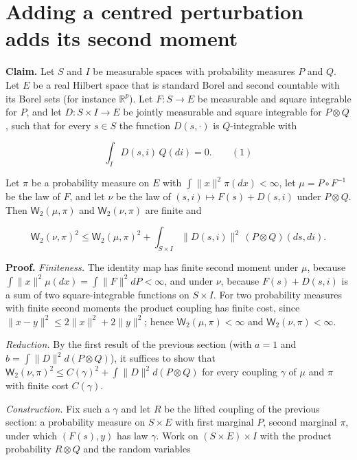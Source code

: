 \documentclass[11pt,a4paper]{article}
\begin{document}
\section{\texorpdfstring{Adding a centred perturbation adds its second moment}{Adding a centred perturbation adds its second moment}}


\textbf{Claim.} Let \(S\) and \(I\) be measurable spaces with probability measures \(P\) and \(Q\). Let \(E\) be a real Hilbert space that is standard Borel and second countable with its Borel sets (for instance \(\mathbb R^p\)). Let \(F:S\to E\) be measurable and square integrable for \(P\), and let \(D:S\times I\to E\) be jointly measurable and square integrable for \(P\otimes Q\), such that for every \(s\in S\) the function \(D(s,\cdot)\) is \(Q\)-integrable with


\[\int_ID(s,i)\,Q(di)=0.\qquad(1)\]


Let \(\pi\) be a probability measure on \(E\) with \(\int\|x\|^2\pi(dx)<\infty\), let \(\mu=P\circ F^{-1}\) be the law of \(F\), and let \(\nu\) be the law of \((s,i)\mapsto F(s)+D(s,i)\) under \(P\otimes Q\). Then \(\mathsf W_2(\mu,\pi)\) and \(\mathsf W_2(\nu,\pi)\) are finite and


\[\mathsf W_2(\nu,\pi)^2\le\mathsf W_2(\mu,\pi)^2+\int_{S\times I}\|D(s,i)\|^2\,(P\otimes Q)(ds,di).\]


\textbf{Proof.} \emph{Finiteness.} The identity map has finite second moment under \(\mu\), because \(\int\|x\|^2\mu(dx)=\int\|F\|^2dP<\infty\), and under \(\nu\), because \(F(s)+D(s,i)\) is a sum of two square-integrable functions on \(S\times I\). For two probability measures with finite second moments the product coupling has finite cost, since \(\|x-y\|^2\le2\|x\|^2+2\|y\|^2\); hence \(\mathsf W_2(\mu,\pi)<\infty\) and \(\mathsf W_2(\nu,\pi)<\infty\).




\emph{Reduction.} By the first result of the previous section (with \(a=1\) and \(b=\int\|D\|^2d(P\otimes Q)\)), it suffices to show that \(\mathsf W_2(\nu,\pi)^2\le C(\gamma)^2+\int\|D\|^2d(P\otimes Q)\) for every coupling \(\gamma\) of \(\mu\) and \(\pi\) with finite cost \(C(\gamma)\).




\emph{Construction.} Fix such a \(\gamma\) and let \(R\) be the lifted coupling of the previous section: a probability measure on \(S\times E\) with first marginal \(P\), second marginal \(\pi\), under which \((F(s),y)\) has law \(\gamma\). Work on \((S\times E)\times I\) with the product probability \(R\otimes Q\) and the random variables
\end{document}
